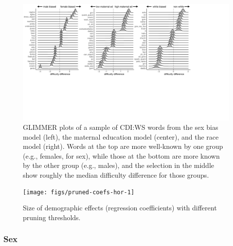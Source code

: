 \documentclass[10pt, letterpaper]{article}
\newenvironment{CodeChunk}{}{}
\begin{document}
\begin{CodeChunk}
\begin{figure}[h]

{\centering \includegraphics[width=\linewidth]{figs/smGLIMMER_combo} 

}

\caption[GLIMMER plots of a sample of CDI:WS words from the sex bias model (left), the maternal education model (center), and the race model (right)]{GLIMMER plots of a sample of CDI:WS words from the sex bias model (left), the maternal education model (center), and the race model (right). Words at the top are more well-known by one group (e.g., females, for sex), while those at the bottom are more known by the other group (e.g., males), and the selection in the middle show roughly the median difficulty difference for those groups.}\label{fig:glimmer-combo}
\end{figure}
\end{CodeChunk}

\begin{CodeChunk}
\begin{figure}[h]

{\centering \texttt{[image: figs/pruned-coefs-hor-1]} 

}

\caption[Size of demographic effects (regression coefficients) with different pruning thresholds]{Size of demographic effects (regression coefficients) with different pruning thresholds.}\label{fig:pruned-coefs-hor}
\end{figure}
\end{CodeChunk}

\hypertarget{sex}{%
\subsubsection{Sex}\label{sex}}
\end{document}
